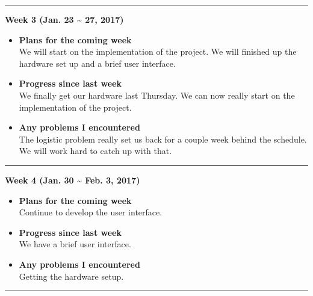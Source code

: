 	\rule{\textwidth}{0.5pt}

	\begin{center}
		\textbf{Week 3 (Jan. 23 {\textasciitilde{}} 27, 2017)}
	\end{center}
	\begin{itemize}
		\item \textbf{Plans for the coming week}
		\\We will start on the implementation of the project. We will finished up the hardware set up and a brief user interface. \\

		\item \textbf{Progress since last week}
		\\We finally get our hardware last Thursday. We can now really start on the implementation of the project. \\

		\item \textbf{Any problems I encountered}
		\\The logistic problem really set us back for a couple week behind the schedule. We will work hard to catch up with that.\\
	\end{itemize}

	\rule{\textwidth}{0.5pt}

	\begin{center}
		\textbf{Week 4 (Jan. 30 {\textasciitilde{}} Feb. 3, 2017)}
	\end{center}
	\begin{itemize}
		\item \textbf{Plans for the coming week}
		\\Continue to develop the user interface. \\

		\item \textbf{Progress since last week}
		\\We have a brief user interface. \\

		\item \textbf{Any problems I encountered}
		\\Getting the hardware setup.\\
	\end{itemize}

	\rule{\textwidth}{0.5pt}

